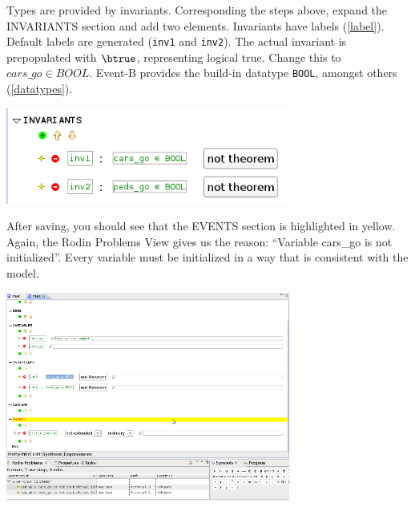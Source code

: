 Types are provided by invariants.  Corresponding the steps above, expand the \textsf{INVARIANTS} section and add two elements.  Invariants have labels (\ref{label}).  Default labels are generated (\texttt{inv1} and \texttt{inv2}).  The actual invariant is prepopulated with $\btrue$, representing logical true.  Change this to $cars\_go \in  BOOL$.  Event-B provides the build-in datatype \texttt{BOOL}, amongst others (\ref{datatypes}).

\begin{center}
	\includegraphics[width=0.7\textwidth]{img/tutorial/tut_3_invariants.png}
\end{center}


After saving, you should see that the \textsf{EVENTS} section is highlighted in yellow.  Again, the \textsf{Rodin Problems} View gives us the reason: ``Variable cars\_go is not initialized''.  Every variable must be initialized in a way that is consistent with the model.
\begin{center}
	\includegraphics[width=0.7\textwidth]{img/tutorial/tut_3_yellow.png}
\end{center}

